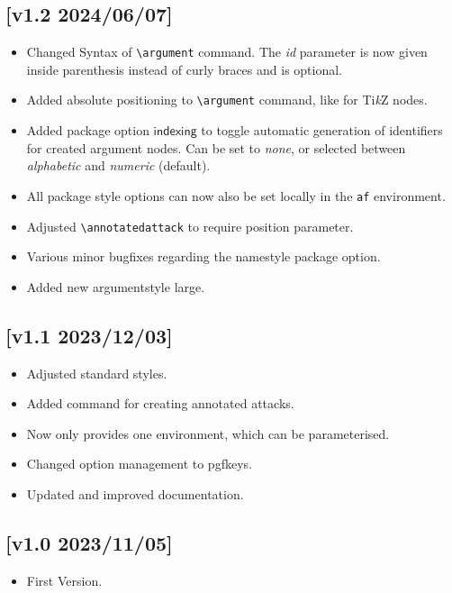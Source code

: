 \documentclass[headings=normal]{scrartcl}
\newcommand{\tikzname}{Ti\emph{k}Z\xspace}
\begin{document}
\subsection*{[v1.2 2024/06/07]}
\begin{itemize}
    \item Changed Syntax of \verb|\argument| command. The \textit{id} parameter is now given inside parenthesis instead of curly braces and is optional.
    \item Added absolute positioning to \verb|\argument| command, like for \tikzname nodes.
    \item Added package option $\textsf{indexing}$ to toggle automatic generation of identifiers for created argument nodes. Can be set to \textit{none}, or selected between \textit{alphabetic} and \textit{numeric} (default).
    \item All package style options can now also be set locally in the \texttt{af} environment.
    \item Adjusted \verb|\annotatedattack| to require position parameter.
    \item Various minor bugfixes regarding the \textsf{namestyle} package option.
    \item Added new argumentstyle \textsf{large}.
\end{itemize}

\subsection*{[v1.1 2023/12/03]}
\begin{itemize}
    \item Adjusted standard styles.
    \item Added command for creating annotated attacks.
    \item Now only provides one environment, which can be parameterised.
    \item Changed option management to pgfkeys.
    \item Updated and improved documentation.
\end{itemize}

\subsection*{[v1.0 2023/11/05]}
\begin{itemize}
    \item First Version.
\end{itemize}
\end{document}
